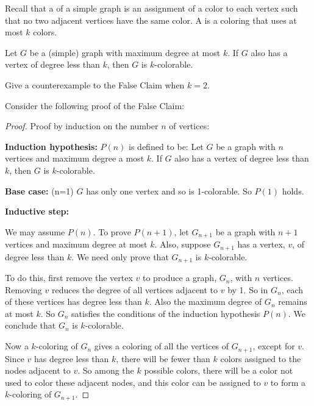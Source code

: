 \documentclass[12pt,twoside]{article} \usepackage{light}
\begin{document}
\begin{problem}{15}
Recall that a  of a simple graph is an assignment of a
color to each vertex such that no two adjacent vertices have the same
color.  A  is a coloring that uses at most $k$
colors.

\begin{falseclm*}
Let $G$ be a (simple) graph with maximum degree at most $k$.  If $G$
also has a vertex of degree less than $k$, then $G$ is $k$-colorable.
\end{falseclm*}

\bparts {}\label{counterexample} Give a counterexample to the
False Claim when $k=2$.


 Consider the following proof of the False Claim:

\begin{proof}

Proof by induction on the number $n$ of vertices:

{\bf Induction hypothesis:} $P(n)$ is defined to be: Let $G$ be a
graph with $n$ vertices and maximum degree a most $k$.  If $G$ also
has a vertex of degree less than $k$, then $G$ is $k$-colorable.

{\bf Base case:} (n=1) $G$ has only one vertex and so is 1-colorable.
So $P(1)$ holds.

{\bf Inductive step:}

We may assume $P(n)$.  To prove $P(n+1)$, let $G_{n+1}$ be a graph
with $n+1$ vertices and maximum degree at most $k$.  Also, suppose
$G_{n+1}$ has a vertex, $v$, of degree less than $k$.  We need only
prove that $G_{n+1}$ is $k$-colorable.

To do this, first remove the vertex $v$ to produce a graph, $G_n$,
with $n$ vertices.  Removing $v$ reduces the degree of all vertices
adjacent to $v$ by 1.  So in $G_n$, each of these vertices has degree
less than $k$.  Also the maximum degree of $G_n$ remains at most $k$.
So $G_n$ satisfies the conditions of the induction hypothesis $P(n)$.
We conclude that $G_n$ is $k$-colorable.

Now a $k$-coloring of $G_n$ gives a coloring of all the vertices of
$G_{n+1}$, except for $v$.  Since $v$ has degree less than $k$, there
will be fewer than $k$ colors assigned to the nodes adjacent to $v$.
So among the $k$ possible colors, there will be a color not used to
color these adjacent nodes, and this color can be assigned to $v$ to
form a $k$-coloring of $G_{n+1}$.
\end{proof}


\end{problem}
\end{document}
